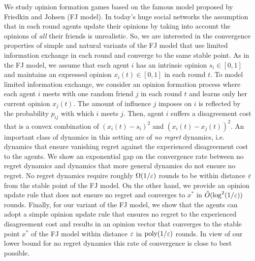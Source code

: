 We study opinion formation games based on the famous model proposed by Friedkin
and Johsen (FJ model). In today's huge social networks the assumption that in
each round agents update their opinions by taking into account the opinions of
\emph{all} their friends is unrealistic. So, we are interested in the convergence
properties of simple and natural variants of the FJ model that use limited
information exchange in each round and converge to the same stable point.
%
As in the FJ model, we assume that each agent $i$ has an intrinsic opinion $s_i
\in [0,1]$ and maintains an expressed opinion $x_i(t) \in [0,1]$ in each round
$t$. To model limited information exchange, we consider an opinion formation
process where each agent $i$ meets with  one random friend $j$ in each round
$t$ and learns only her current opinion $x_j(t)$. The amount of influence $j$
imposes on $i$ is reflected by the probability $p_{ij}$ with which $i$ meets
$j$. Then, agent $i$ suffers a disagreement cost that is a convex combination
of $(x_i(t) - s_i)^2$ and $(x_i(t) - x_j(t))^2$.
%
An important class of dynamics in this setting are of \emph{no regret} dynamics,
i.e. dynamics that ensure vanishing regret against the experienced
disagreement cost to the agents.  We show an exponential gap on
the convergence rate between no regret dynamics and dynamics that more general
dynamics do not ensure no regret.  No regret dynamics require roughly
$\Omega(1/\varepsilon)$ rounds to be within distance $\varepsilon$ from the stable point of
the FJ model.  On the other hand, we provide an opinion update rule that does
not ensure no regret and converges to $x^\ast$ in $\tilde{O}(\log^2(1/\varepsilon))$
rounds.  Finally, for our variant
of the FJ model, we show that the agents can adopt a simple opinion update rule
that ensures no regret to the experienced disagreement cost and results in an
opinion vector that converges to the stable point $x^\ast$ of the FJ model
within distance $\varepsilon$ in $\mathrm{poly}(1/\varepsilon)$ rounds. In view of our
lower bound for no regret dynamics this rate of convergence is close to best
possible.
